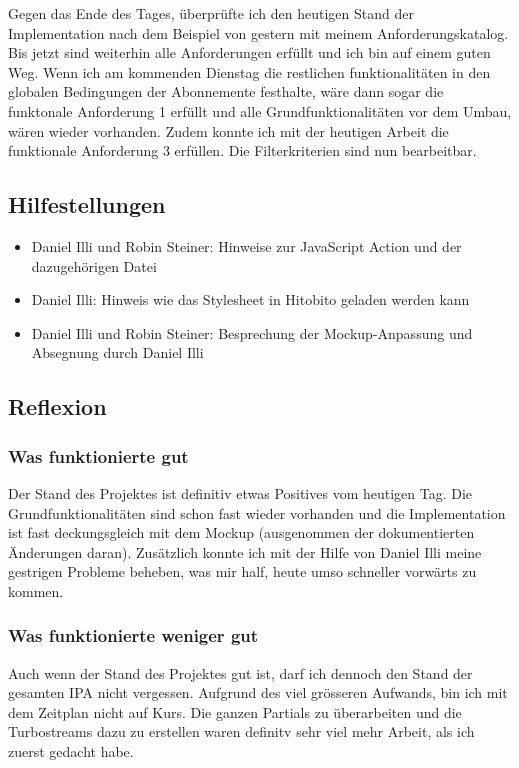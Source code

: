 Gegen das Ende des Tages, überprüfte ich den heutigen Stand der Implementation nach dem Beispiel von gestern mit meinem Anforderungskatalog. Bis jetzt sind weiterhin
alle Anforderungen erfüllt und ich bin auf einem guten Weg. Wenn ich am kommenden Dienstag die restlichen funktionalitäten in den globalen Bedingungen der Abonnemente
festhalte, wäre dann sogar die funktonale Anforderung 1 erfüllt und alle Grundfunktionalitäten vor dem Umbau, wären wieder vorhanden.  Zudem konnte ich mit der heutigen Arbeit 
die funktionale Anforderung 3 erfüllen. Die Filterkriterien sind nun bearbeitbar.

\subsection*{Hilfestellungen}
\begin{itemize}
    \item Daniel Illi und Robin Steiner: Hinweise zur JavaScript Action und der dazugehörigen Datei
    \item Daniel Illi: Hinweis wie das Stylesheet in Hitobito geladen werden kann
    \item Daniel Illi und Robin Steiner: Besprechung der Mockup-Anpassung und Absegnung durch Daniel Illi
\end{itemize}

\subsection*{Reflexion}

\subsubsection*{Was funktionierte gut}
Der Stand des Projektes ist definitiv etwas Positives vom heutigen Tag. Die Grundfunktionalitäten sind schon fast wieder vorhanden
und die Implementation ist fast deckungsgleich mit dem Mockup (ausgenommen der dokumentierten Änderungen daran). Zusätzlich konnte ich mit der Hilfe
von Daniel Illi meine gestrigen Probleme beheben, was mir half, heute umso schneller vorwärts zu kommen.

\subsubsection*{Was funktionierte weniger gut}
Auch wenn der Stand des Projektes gut ist, darf ich dennoch den Stand der gesamten IPA nicht vergessen.
Aufgrund des viel grösseren Aufwands, bin ich mit dem Zeitplan nicht auf Kurs. Die ganzen Partials zu überarbeiten und
die Turbostreams dazu zu erstellen waren definitv sehr viel mehr Arbeit, als ich zuerst gedacht habe.

